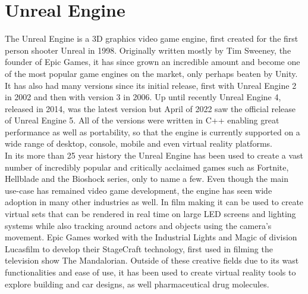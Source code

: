 \chapter{Unreal Engine}\label{chp:UnrealEngine}

The Unreal Engine is a 3D graphics video game engine, first created for the first person shooter Unreal in 1998\cite{UnrealWiki}. Originally written mostly by Tim Sweeney, the founder of Epic Games, it has since grown an incredible amount and become one of the most popular game engines on the market, only perhaps beaten by Unity\cite{}. It has also had many versions since its initial release, first with Unreal Engine 2 in 2002 and then with version 3 in 2006\cite{}. Up until recently Unreal Engine 4, released in 2014, was the latest version but April of 2022 saw the official release of Unreal Engine 5. All of the versions were written in C++ enabling great performance as well as portability, so that the engine is currently supported on a wide range of desktop, console, mobile and even virtual reality platforms\cite{}.\\

In its more than 25 year history the Unreal Engine has been used to create a vast number of incredibly popular and critically acclaimed games such as Fortnite, Hellblade and the Bioshock series, only to name a few. Even though the main use-case has remained video game development, the engine has seen wide adoption in many other industries as well. In film making it can be used to create virtual sets that can be rendered in real time on large LED screens and lighting systems while also tracking around actors and objects using the camera's movement. Epic Games worked with the Industrial Lights and Magic of division Lucasfilm to develop their StageCraft technology\cite{StageCraft}, first used in filming the television show The Mandalorian\cite{Mando}. Outside of these creative fields due to its wast functionalities and ease of use, it has been used to create virtual reality tools to explore building and car designs, as well pharmaceutical drug molecules\cite{unrealwiki}.\\

